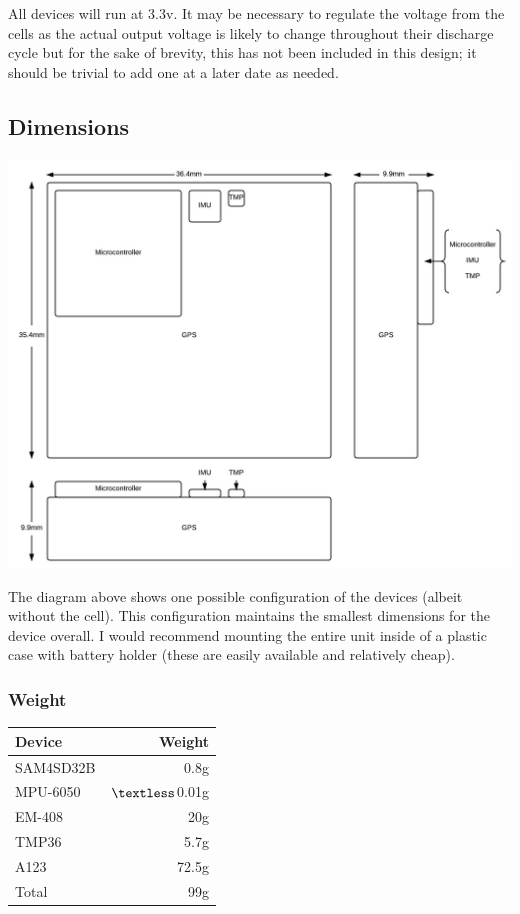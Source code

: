 \documentclass[a4paper, twoside]{article}
\begin{document}
All devices will run at 3.3v. It may be necessary to regulate the voltage from
the cells as the actual output voltage is likely to change throughout their
discharge cycle but for the sake of brevity, this has not been included in this
design; it should be trivial to add one at a later date as needed.

\clearpage
\subsection{Dimensions}
\begin{center}
\includegraphics[scale=0.25]{images/layout.jpeg}
\end{center}

The diagram above shows one possible configuration of the devices (albeit
without the cell). This configuration maintains the smallest dimensions for the
device overall. I would recommend mounting the entire unit inside of a plastic
case with battery holder (these are easily available and relatively cheap).

\subsubsection{Weight}
\begin{tabular}{|l|r|}
	\hline
	\textbf{Device} & \textbf{Weight} \\
	\hline
	\hline
	SAM4SD32B & 0.8g \\
	MPU-6050 & $\textless$0.01g \\
	EM-408 & 20g \\
	TMP36 & 5.7g \\
	A123 & 72.5g \\
	\hline
	\hline
	Total & 99g \\
	\hline
\end{tabular}
\end{document}

